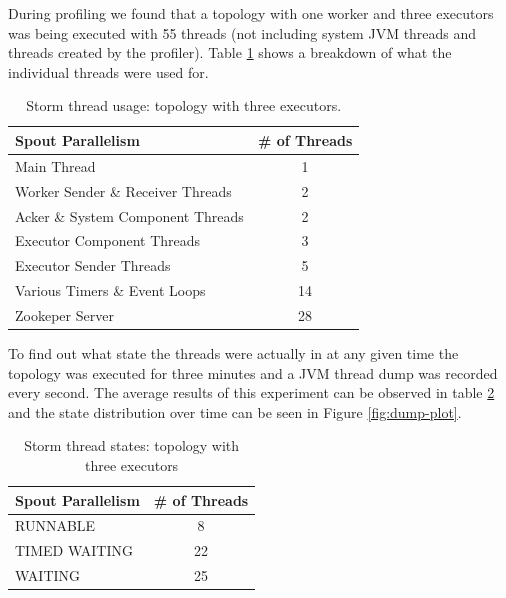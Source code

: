 \documentclass[bsc,logo,frontabs,twoside,singlespacing,normalheadings,parskip]{infthesis}\usepackage[]{graphicx}\usepackage[]{color}
\begin{document}
During profiling we found that a topology with one worker and three executors was being executed with 55 threads (not including system JVM threads and threads created by the profiler). Table \ref{table:breakdown} shows a breakdown of what the individual threads were used for.

\begin{table}[htb!]
\centering
\small
\begin{tabular}{@{}lc@{}}
    \textbf{Spout Parallelism} & \textbf{\# of Threads} \\ \toprule
    Main Thread & 1  \\
	Worker Sender \& Receiver Threads & 2  \\
    Acker \& System Component Threads & 2  \\
    Executor Component Threads & 3  \\
    Executor Sender Threads & 5  \\
    Various Timers \& Event Loops & 14  \\
    Zookeper Server & 28  \\
\end{tabular}
\caption[Storm thread usage]{Storm thread usage: topology with three executors.}
\label{table:breakdown}
\end{table}

To find out what state the threads were actually in at any given time the topology was executed for three minutes and a JVM thread dump was recorded every second. The average results of this experiment can be observed in table \ref{table:dump} and the state distribution over time can be seen in Figure \ref{fig:dump-plot}.

\begin{table}[htb!]
\centering
\small
\begin{tabular}{@{}lc@{}}
    \textbf{Spout Parallelism} & \textbf{\# of Threads} \\ \toprule
    RUNNABLE & 8  \\
	TIMED WAITING & 22  \\
    WAITING & 25  \\
\end{tabular}
\caption[Storm thread states]{Storm thread states: topology with three executors}
\label{table:dump}
\end{table}
\end{document}
